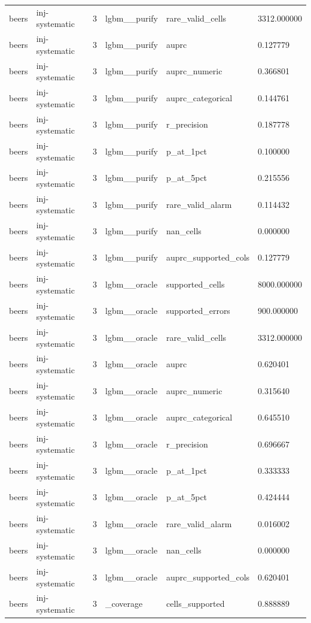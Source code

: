 \begin{tabular}{llllll}
beers & inj-systematic & 3 & lgbm\_\_purify & rare\_valid\_cells & 3312.000000 \\
beers & inj-systematic & 3 & lgbm\_\_purify & auprc & 0.127779 \\
beers & inj-systematic & 3 & lgbm\_\_purify & auprc\_numeric & 0.366801 \\
beers & inj-systematic & 3 & lgbm\_\_purify & auprc\_categorical & 0.144761 \\
beers & inj-systematic & 3 & lgbm\_\_purify & r\_precision & 0.187778 \\
beers & inj-systematic & 3 & lgbm\_\_purify & p\_at\_1pct & 0.100000 \\
beers & inj-systematic & 3 & lgbm\_\_purify & p\_at\_5pct & 0.215556 \\
beers & inj-systematic & 3 & lgbm\_\_purify & rare\_valid\_alarm & 0.114432 \\
beers & inj-systematic & 3 & lgbm\_\_purify & nan\_cells & 0.000000 \\
beers & inj-systematic & 3 & lgbm\_\_purify & auprc\_supported\_cols & 0.127779 \\
beers & inj-systematic & 3 & lgbm\_\_oracle & supported\_cells & 8000.000000 \\
beers & inj-systematic & 3 & lgbm\_\_oracle & supported\_errors & 900.000000 \\
beers & inj-systematic & 3 & lgbm\_\_oracle & rare\_valid\_cells & 3312.000000 \\
beers & inj-systematic & 3 & lgbm\_\_oracle & auprc & 0.620401 \\
beers & inj-systematic & 3 & lgbm\_\_oracle & auprc\_numeric & 0.315640 \\
beers & inj-systematic & 3 & lgbm\_\_oracle & auprc\_categorical & 0.645510 \\
beers & inj-systematic & 3 & lgbm\_\_oracle & r\_precision & 0.696667 \\
beers & inj-systematic & 3 & lgbm\_\_oracle & p\_at\_1pct & 0.333333 \\
beers & inj-systematic & 3 & lgbm\_\_oracle & p\_at\_5pct & 0.424444 \\
beers & inj-systematic & 3 & lgbm\_\_oracle & rare\_valid\_alarm & 0.016002 \\
beers & inj-systematic & 3 & lgbm\_\_oracle & nan\_cells & 0.000000 \\
beers & inj-systematic & 3 & lgbm\_\_oracle & auprc\_supported\_cols & 0.620401 \\
beers & inj-systematic & 3 & \_coverage & cells\_supported & 0.888889 \\

\end{tabular}

